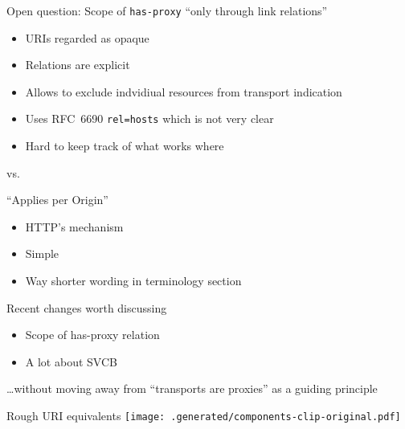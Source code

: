 \begin{frame}{Open question: Scope of \texttt{has-proxy}}\large
  \color{gray}
  ``only through link relations''

  \begin{itemize}
    \color{gray}
    \item URIs regarded as opaque
    \item Relations are explicit
    \item Allows to exclude indvidiual resources from transport indication
    \item Uses RFC~6690 \texttt{rel=hosts} which is not very clear
    \item Hard to keep track of what works where
  \end{itemize}
  
  \color{black}
  \begin{center}
  vs.
  \end{center}

  ``Applies per Origin''

  \begin{itemize}
    \item HTTP's mechanism
    \item Simple
    \item Way shorter wording in terminology section
  \end{itemize}
\end{frame}

\begin{frame}{Recent changes worth discussing}\Large
  \begin{itemize}
    \color{gray} 
    \item Scope of has-proxy relation
    \color{black}
    \item A lot about SVCB
  \end{itemize}

  \bigskip

  \ldots without moving away from ``transports are proxies'' as a guiding principle
\end{frame}



\begin{frame}{Rough URI equivalents}
\vspace{-1cm}
\texttt{[image: .generated/components-clip-original.pdf]}
\end{frame}


